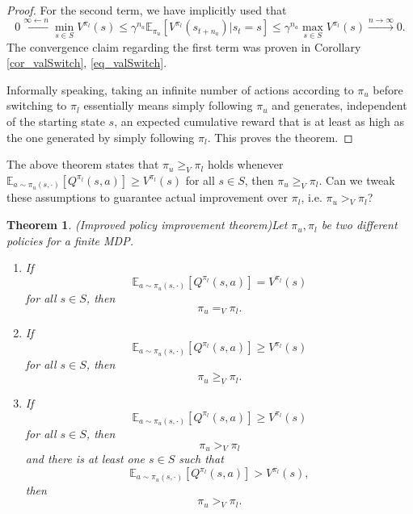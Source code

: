 \documentclass[11pt]{article} %
\newtheorem{thm}{Theorem}
\begin{document}
\begin{proof}
	For the second term, we have implicitly used that $$0 \overset{\infty \leftarrow n}{\leftarrow} \min_{s \in S} V^{\pi_l}(s) \le \gamma^{n_a}\mathbb{E}_{\pi_u}[V^{\pi_l}(s_{t+n_a}) | s_t = s] \le \gamma^{n_a} \max_{s \in S} V^{\pi_l}(s) \overset{n \rightarrow \infty}{\rightarrow} 0.$$ The convergence claim regarding the first term was proven in Corollary \ref{cor_valSwitch}, \ref{eq_valSwitch}.

Informally speaking, taking an infinite number of actions according to $\pi_u$ before switching to $\pi_l$ essentially means simply following $\pi_u$ and generates, independent of the starting state $s$, an expected cumulative reward that is at least as high as the one generated by simply following $\pi_l$. This proves the theorem.

\end{proof}

The above theorem states that $\pi_u \ge_V \pi_l$ holds whenever $ \mathbb{E}_{a \sim \pi_u(s,\cdot )}[Q^{\pi_l}(s,a)] \ge V^{\pi_l}(s)$ for all $s \in S$, then $\pi_u \ge_V \pi_l.$ Can we tweak these assumptions to guarantee actual improvement over $\pi_l$, i.e. $\pi_u >_V \pi_l$?

\begin{thm}{(Improved policy improvement theorem)}\label{thm_polImp2}
	Let $\pi_u, \pi_l$ be two different policies for a finite MDP.
	\begin{enumerate}
		\item If $$ \mathbb{E}_{a \sim \pi_u(s,\cdot )}[Q^{\pi_l}(s,a)] = V^{\pi_l}(s)$$ for all $s \in S$, then $$\pi_u =_V \pi_l.$$
		\item If $$ \mathbb{E}_{a \sim \pi_u(s,\cdot )}[Q^{\pi_l}(s,a)] \ge V^{\pi_l}(s)$$ for all $s \in S$, then $$\pi_u \ge_V \pi_l.$$
		\item If $$ \mathbb{E}_{a \sim \pi_u(s,\cdot )}[Q^{\pi_l}(s,a)] \ge V^{\pi_l}(s)$$ for all $s \in S$, then $$\pi_u >_V \pi_l$$ and there is at least one $s \in S$ such that $$ \mathbb{E}_{a \sim \pi_u(s,\cdot )}[Q^{\pi_l}(s,a)] > V^{\pi_l}(s),$$ then $$\pi_u >_V \pi_l.$$
	\end{enumerate}
\end{thm}
\end{document}
